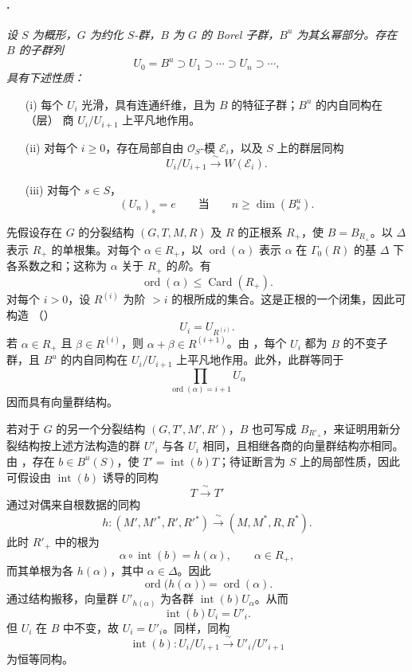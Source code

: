 \paragraph{.}
{\itshape 设 \(S\) 为概形，\(G\) 为约化 \(S\)-群，\(B\) 为 \(G\) 的 Borel 子群，\(B^u\) 为其幺幂部分。存在 \(B\) 的子群列
\[
  U_0=B^u\supset U_1\supset\cdots\supset U_n\supset\cdots,
\]
具有下述性质：
\begin{enumerate}
\item[\textup{(i)}] 每个 \(U_i\) 光滑，具有连通纤维，且为 \(B\) 的特征子群；\(B^u\) 的内自同构在 \textup{（层）} 商 \(U_i/U_{i+1}\) 上平凡地作用。

\item[\textup{(ii)}] 对每个 \(i\geq 0\)，存在局部自由 \(\mathcal O_S\)-模 \(\mathcal E_i\)，以及 \(S\) 上的群层同构
\[
  U_i/U_{i+1}\xrightarrow{\;\sim\;}W(\mathcal E_i).
\]

\item[\textup{\SGAInlineRefTarget{sga3:xxii:prop:5.9.5:item:iii}(iii)}] 对每个 \(s\in S\)，
\[
  (U_n)_s=e
  \qquad\text{当}\qquad
  n\geq\dim(B^u_s).
\]
\end{enumerate}}

先假设存在 \(G\) 的分裂结构 \((G,T,M,R)\) 及 \(R\) 的正根系 \(R_+\)，使 \(B=B_{R_+}\)。以 \(\Delta\) 表示 \(R_+\) 的单根集。对每个 \(\alpha\in R_+\)，以 \(\operatorname{ord}(\alpha)\) 表示 \(\alpha\) 在 \(\Gamma_0(R)\) 的基 \(\Delta\) 下各系数之和；这称为 \(\alpha\) 关于 \(R_+\) 的\emph{阶}。有
\[
  \operatorname{ord}(\alpha)\leq\operatorname{Card}(R_+).
\]
对每个 \(i>0\)，设 \(R^{(i)}\) 为阶 \(>i\) 的根所成的集合。这是正根的一个闭集，因此可构造 \textup{（）}
\[
  U_i=U_{R^{(i)}}.
\]
若 \(\alpha\in R_+\) 且 \(\beta\in R^{(i)}\)，则 \(\alpha+\beta\in R^{(i+1)}\)。由 ，每个 \(U_i\) 都为 \(B\) 的不变子群，且 \(B^u\) 的内自同构在 \(U_i/U_{i+1}\) 上平凡地作用。此外，此群等同于
\[
  \prod_{\operatorname{ord}(\alpha)=i+1}U_\alpha
\]
因而具有向量群结构。

若对于 \(G\) 的另一个分裂结构 \((G,T',M',R')\)，\(B\) 也可写成 \(B_{R'_+}\)，来证明用新分裂结构按上述方法构造的群 \(U'_i\) 与各 \(U_i\) 相同，且相继各商的向量群结构亦相同。由 ，存在 \(b\in B^u(S)\)，使 \(T'=\operatorname{int}(b)T\)；待证断言为 \(S\) 上的局部性质，因此可假设由 \(\operatorname{int}(b)\) 诱导的同构
\[
  T\xrightarrow{\;\sim\;}T'
\]
通过对偶来自根数据的同构
\[
  h:(M',M'{}^*,R',R'{}^*)
  \xrightarrow{\;\sim\;}
  (M,M^*,R,R^*).
\]
此时 \(R'_+\) 中的根为
\[
  \alpha\circ\operatorname{int}(b)=h(\alpha),
  \qquad \alpha\in R_+,
\]
而其单根为各 \(h(\alpha)\)，其中 \(\alpha\in\Delta\)。因此
\[
  \operatorname{ord}\bigl(h(\alpha)\bigr)
  =
  \operatorname{ord}(\alpha).
\]
通过结构搬移，向量群 \(U'_{h(\alpha)}\) 为各群 \(\operatorname{int}(b)U_\alpha\)。从而
\[
  \operatorname{int}(b)U_i=U'_i.
\]
但 \(U_i\) 在 \(B\) 中不变，故 \(U_i=U'_i\)。同样，同构
\[
  \operatorname{int}(b):
  U_i/U_{i+1}\xrightarrow{\;\sim\;}U'_i/U'_{i+1}
\]
为恒等同构。

